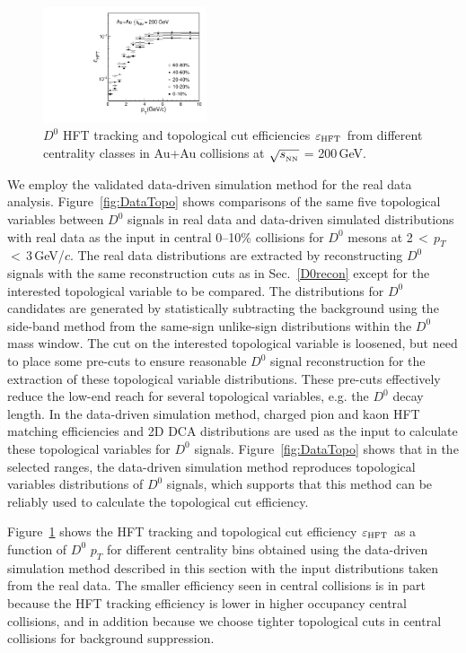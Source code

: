 \documentclass[%
 reprint,	
 amsmath,amssymb,
 aps,
 prc,
]{revtex4-1}
\begin{document}
\begin{figure}[h]
\centering
\includegraphics[width=0.43\textwidth]{fig/Datad0Eff_hftTopo_10.pdf}
\caption{$D^{0}$ HFT tracking and topological cut efficiencies $\varepsilon_{\rm HFT}$ from different centrality classes in Au+Au collisions at $\sqrt{s_{_{\rm NN}}}$ = 200\,GeV.}
\label{fig:Datad0Eff_hftTopo} 
\end{figure}


We employ the validated data-driven simulation method for the real data analysis. Figure~\ref{fig:DataTopo} shows comparisons of the same five topological variables between $D^0$ signals in real data and data-driven simulated distributions with real data as the input in central 0--10\% collisions for $D^0$ mesons at 2\,$<$\,$p_{T}$\,$<$\,3\,GeV/$c$. The real data distributions are extracted by reconstructing $D^0$ signals with the same reconstruction cuts as in Sec.~\ref{D0recon} except for the interested topological variable to be compared. The distributions for $D^0$ candidates are generated by statistically subtracting the background using the side-band method from the same-sign unlike-sign distributions within the $D^0$ mass window. The cut on the interested topological variable is loosened, but need to place some pre-cuts to ensure reasonable $D^0$ signal reconstruction for the extraction of these topological variable distributions. These pre-cuts effectively reduce the low-end reach for several topological variables, e.g. the $D^0$ decay length. In the data-driven simulation method, charged pion and kaon HFT matching efficiencies and 2D DCA distributions are used as the input to calculate these topological variables for $D^0$ signals. Figure~\ref{fig:DataTopo} shows that in the selected ranges, the data-driven simulation method reproduces topological variables distributions of $D^0$ signals, which supports that this method can be reliably used to calculate the topological cut efficiency.


Figure~\ref{fig:Datad0Eff_hftTopo} shows the HFT tracking and topological cut efficiency $\varepsilon_{\rm HFT}$ as a function of $D^0$ $p_{T}$ for different centrality bins obtained using the data-driven simulation method described in this section with the input distributions taken from the real data. The smaller efficiency seen in central collisions is in part because the HFT tracking efficiency is lower in higher occupancy central collisions, and in addition because we choose tighter topological cuts in central collisions for background suppression.
\end{document}
